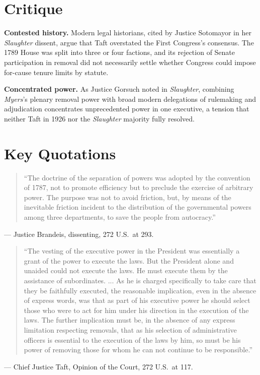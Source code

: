 \documentclass[12pt]{article}
\begin{document}
\section{Critique}

\textbf{Contested history.} Modern legal historians, cited by Justice Sotomayor in her \textit{Slaughter} dissent, argue that Taft overstated the First Congress's consensus. The 1789 House was split into three or four factions, and its rejection of Senate participation in removal did not necessarily settle whether Congress could impose for-cause tenure limits by statute.

\textbf{Concentrated power.} As Justice Gorsuch noted in \textit{Slaughter}, combining \textit{Myers}'s plenary removal power with broad modern delegations of rulemaking and adjudication concentrates unprecedented power in one executive, a tension that neither Taft in 1926 nor the \textit{Slaughter} majority fully resolved.

\section{Key Quotations}

\begin{quote}
``The doctrine of the separation of powers was adopted by the convention of 1787, not to promote efficiency but to preclude the exercise of arbitrary power. The purpose was not to avoid friction, but, by means of the inevitable friction incident to the distribution of the governmental powers among three departments, to save the people from autocracy.''
\end{quote}
\noindent --- Justice Brandeis, dissenting, 272 U.S.\ at 293.

\begin{quote}
``The vesting of the executive power in the President was essentially a grant of the power to execute the laws. But the President alone and unaided could not execute the laws. He must execute them by the assistance of subordinates. ... As he is charged specifically to take care that they be faithfully executed, the reasonable implication, even in the absence of express words, was that as part of his executive power he should select those who were to act for him under his direction in the execution of the laws. The further implication must be, in the absence of any express limitation respecting removals, that as his selection of administrative officers is essential to the execution of the laws by him, so must be his power of removing those for whom he can not continue to be responsible.''
\end{quote}
\noindent --- Chief Justice Taft, Opinion of the Court, 272 U.S.\ at 117.
\end{document}

